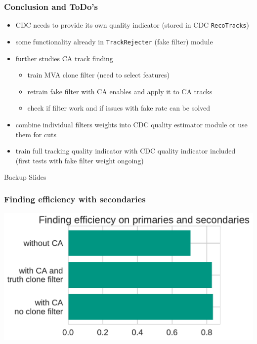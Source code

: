 \documentclass[18pt]{beamer}
\begin{document}
\begin{frame}
  \frametitle{Conclusion and ToDo's}
  \begin{itemize}
  \item CDC needs to provide its own quality indicator (stored in CDC \texttt{RecoTracks})
  \item some functionality already in \texttt{TrackRejecter} (fake filter) module
  \item further studies CA track finding
    \begin{itemize}
    \item train MVA clone filter (need to select features)
    \item retrain fake filter with CA enables and apply it to CA tracks
    \item check if filter work and if issues with fake rate can be solved
    \end{itemize}
  \item combine individual filters weights into CDC quality estimator module or use them for cuts
  \item train full tracking quality indicator with CDC quality indicator included\\
    (first tests with fake filter weight ongoing)
  \end{itemize}

  
\end{frame}

\appendix
\begin{frame}
  \centering \huge Backup Slides
\end{frame}

\begin{frame}
  \frametitle{Finding efficiency with secondaries}
  \centering
  \includegraphics[width=.8\textwidth]{figures/ca_findeff_w_secondaries.pdf}
\end{frame}
\end{document}
